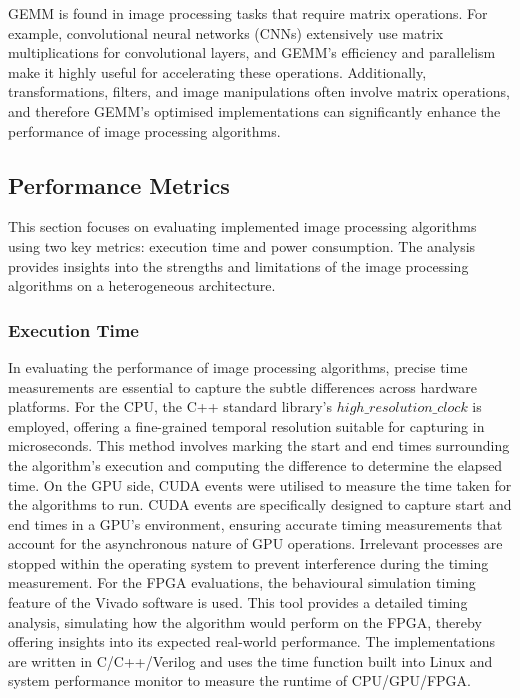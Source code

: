 GEMM is found in image processing tasks that require matrix operations. For example, convolutional neural networks (CNNs) extensively use matrix multiplications for convolutional layers, and GEMM's efficiency and parallelism make it highly useful for accelerating these operations. Additionally, transformations, filters, and image manipulations often involve matrix operations, and therefore GEMM's optimised implementations can significantly enhance the performance of image processing algorithms. 


\subsection{Performance Metrics}
This section focuses on evaluating implemented image processing algorithms using two key metrics: execution time and power consumption. The analysis provides insights into the strengths and limitations of the image processing algorithms on a heterogeneous architecture.


\subsubsection{Execution Time}
In evaluating the performance of image processing algorithms, precise time measurements are essential to capture the subtle differences across hardware platforms. For the CPU, the C++ standard library's $high\_resolution\_clock$ is employed, offering a fine-grained temporal resolution suitable for capturing in microseconds. This method involves marking the start and end times surrounding the algorithm's execution and computing the difference to determine the elapsed time. On the GPU side, CUDA events were utilised to measure the time taken for the algorithms to run. CUDA events are specifically designed to capture start and end times in a GPU's environment, ensuring accurate timing measurements that account for the asynchronous nature of GPU operations. Irrelevant processes are stopped within the operating system to prevent interference during the timing measurement. For the FPGA evaluations, the behavioural simulation timing feature of the Vivado software is used. This tool provides a detailed timing analysis, simulating how the algorithm would perform on the FPGA, thereby offering insights into its expected real-world performance. The  implementations are written in C/C++/Verilog and uses the time function built into Linux and system performance monitor to measure the runtime of CPU/GPU/FPGA.

